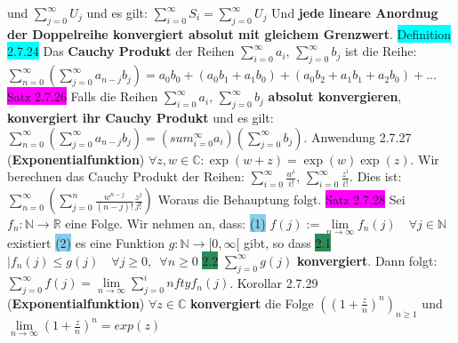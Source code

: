 \documentclass[landscape, 10pt]{article}
\newcommand{\R}{\mathbb{R}}
\newcommand{\N}{\mathbb{N}}
\newcommand{\C}{\mathbb{C}}
\begin{document}
\begin{multicols}{3}
                und \textcolor{NavyBlue}{$\sum_{j=0}^\infty U_j$}
                und es gilt: 
                \textcolor{NavyBlue}{$\sum_{i=0}^\infty S_i=\sum_{j=0}^\infty U_j$}
                Und \textbf{jede lineare Anordnug der Doppelreihe konvergiert 
         absolut mit gleichem Grenzwert}.
\colorbox{cyan}{Definition 2.7.24} Das \textbf{Cauchy Produkt} der Reihen 
                \textcolor{NavyBlue}{$\sum_{i=0}^\infty a_i,\,\sum_{j=0}^\infty b_j$} 
                ist die Reihe: 
         \textcolor{NavyBlue}{$\sum_{n=0}^\infty(\sum_{j=0}^\infty a_{n-j}b_j)
                =a_0b_0+(a_0b_1+a_1b_0)+(a_0b_2+a_1b_1+a_2b_0)+...$}
\colorbox{magenta}{Satz 2.7.26} Falls die Reihen 
                \textcolor{NavyBlue}{$\sum_{i=0}^\infty a_i,\,\sum_{j=0}^\infty b_j$}
                \textbf{absolut konvergieren}, 
                \textbf{konvergiert ihr Cauchy Produkt} und es gilt: 
         \textcolor{NavyBlue}{$\sum_{n=0}^\infty(\sum_{j=0}^\infty a_{n-j}b_j)
                =(sum_{i=0}^\infty a_i)(\sum_{j=0}^\infty b_j)$}.
\colorbox{Dandelion}{Anwendung 2.7.27 } (\textbf{Exponentialfunktion})
                $\forall z,w\in\C:\exp(w+z)
                =\exp(w)\exp(z)$. Wir berechnen das Cauchy Produkt der 
         Reihen: $\sum_{i=0}^\infty\frac{w^i}{i!}$,
                $\sum_{i=0}^\infty\frac{z^i}{i!}$.
                Dies ist:
                $\sum_{n=0}^\infty(\sum_{j=0}^n\frac{w^{n-j}}{(n-j)!}
                \frac{z^j}{j!})$ Woraus die Behauptung folgt.
\colorbox{magenta}{Satz 2.7.28} Sei 
                \textcolor{NavyBlue}{$f_n:\N\longrightarrow\R$} eine Folge. 
                Wir nehmen an, dass: 
                \colorbox{SkyBlue}{(1)} 
                \textcolor{NavyBlue}{
                $f(j):=\lim\limits_{n\to\infty}f_n(j)\quad\forall j\in\N$} 
                existiert 
         \colorbox{SkyBlue}{(2)} es eine Funktion 
                \textcolor{NavyBlue}{$g:\N\longrightarrow[0,\infty[$} gibt,
                so dass \colorbox{SeaGreen}{2.1} 
                \textcolor{NavyBlue}{$|f_n(j)\leqslant g(j)\quad\forall j\geqslant0,\enspace
                \forall n\geqslant0$} 
         \colorbox{SeaGreen}{2.2} \textcolor{NavyBlue}{$\sum_{j=0}^\infty g(j)$} 
                \textbf{konvergiert}. Dann folgt: 
                \textcolor{NavyBlue}{
                $\sum_{j=0}^\infty f(j)=\lim\limits_{n\to\infty}\sum_{j=0}^infty f_n(j)$}.
\colorbox{BurntOrange}{Korollar 2.7.29} (\textbf{Exponentialfunktion})
                \textcolor{NavyBlue}{$\forall z\in\C$} \textbf{konvergiert} die Folge 
                \textcolor{NavyBlue}{$((1+\frac{z}{n})^n)_{n\geqslant1}$} und 
                \textcolor{NavyBlue}{$\lim\limits_{n\to\infty}(1+\frac{z}{n})^n=exp(z)$}


\end{multicols}
\end{document}

